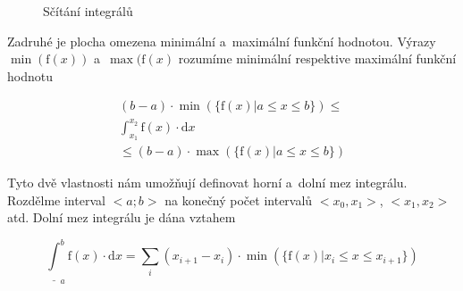 \begin{figure}[ht]
\begin{center}
\caption{Sčítání integrálů}
\end{center}
\label{img:scitani_integralu}
\end{figure}

Zadruhé je plocha omezena minimální a~maximální funkční hodnotou. Výrazy \(\min(\mathrm{f}(x))\) a~\(\max(\mathrm{f}(x)\) rozumíme minimální respektive maximální funkční hodnotu 

\begin{equation}
\begin{split}
(b - a) \cdot \min(\{\mathrm{f}(x) | a \leq x \leq b\}) \leq \\
\int_{x_1}^{x_2} \mathrm{f}(x) \cdot \mathrm{d}x \\
\leq (b - a) \cdot \max(\{\mathrm{f}(x) | a \leq x \leq b\})
\end{split}
\end{equation}

Tyto dvě vlastnosti nám umožňují definovat horní a~dolní mez integrálu. Rozdělme interval \(<a; b>\) na konečný počet intervalů \(<x_0, x_1>\), \(<x_1, x_2>\) atd. Dolní mez integrálu je dána vztahem

\begin{equation}
\label{eq:dolni_mez_integralu}
\underline{\int}_a^b \mathrm{f}(x) \cdot \mathrm{d}x = \sum_{i} (x_{i+1} - x_i) \cdot \min(\{\mathrm{f}(x) | x_i \leq x \leq x_{i+1}\})
\end{equation}


